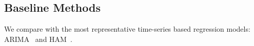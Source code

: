 \documentclass[letterpaper]{article} %
\begin{document}
\subsection{Baseline Methods}
We compare with the most representative time-series based regression models: ARIMA~\cite{ARIMA} and HAM~\cite{Pan2012}. 
%	
\end{document}
